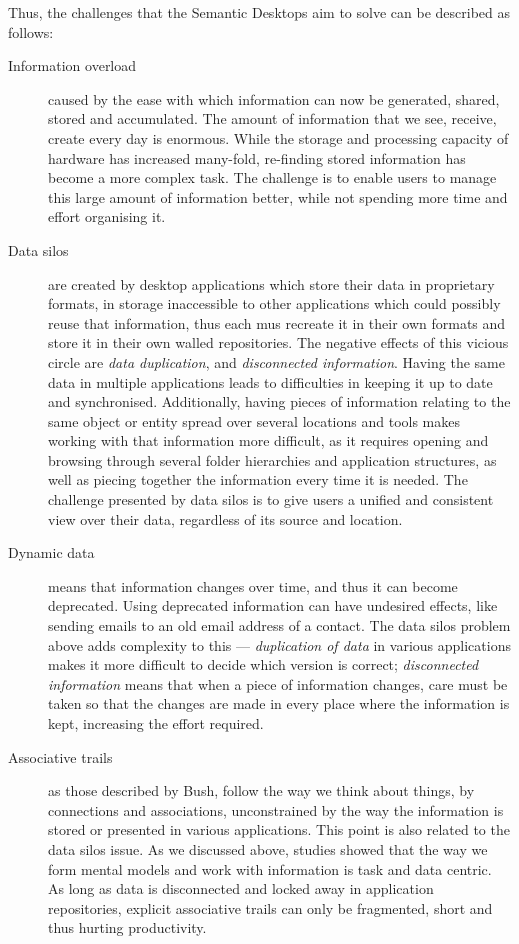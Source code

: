 Thus, the challenges that the Semantic Desktops aim to solve can be described as follows:
\begin{description}
 \item[Information overload] caused by the ease with which information can now be generated, shared, stored and accumulated. The amount of information that we see, receive, create every day is enormous. While the storage and processing capacity of hardware has increased many-fold, re-finding stored information has become a more complex task. The challenge is to enable users to manage this large amount of information better, while not spending more time and effort organising it. 
 \item[Data silos] are created by desktop applications which store their data in proprietary  formats, in storage inaccessible to other applications which could possibly reuse that information, thus each mus recreate it in their own formats and store it in their own walled repositories. 
 The negative effects of this vicious circle are \emph{data duplication}, and \emph{disconnected information}. Having the same data in multiple applications leads to difficulties in keeping it up to date and synchronised. Additionally, having pieces of information relating to the same object or entity spread over several locations and tools makes working with that information more difficult, as it requires opening and browsing through several folder hierarchies and application structures, as well as piecing together the information every time it is needed. The challenge presented by data silos is to give users a unified and consistent view over their data, regardless of its source and location. 
 \item[Dynamic data] means that information changes over time, and thus it can become deprecated. Using deprecated information can have undesired effects, like sending emails to an old email address of a contact. The data silos problem above adds complexity to this --- \emph{duplication of data} in various applications makes it more difficult to decide which version is correct; \emph{disconnected information} means that when a piece of information changes, care must be taken so that the changes are made in every place where the information is kept, increasing the effort required.
 \item[Associative trails] as those described by Bush, follow the way we think about things, by connections and associations, unconstrained by the way the information is stored or presented in various applications. This point is also related to the data silos issue. As we discussed above, studies showed that the way we form mental models and work with information is task and data centric. As long as data is disconnected and locked away in application repositories, explicit associative trails can only be fragmented, short and thus hurting productivity. 
\end{description}


